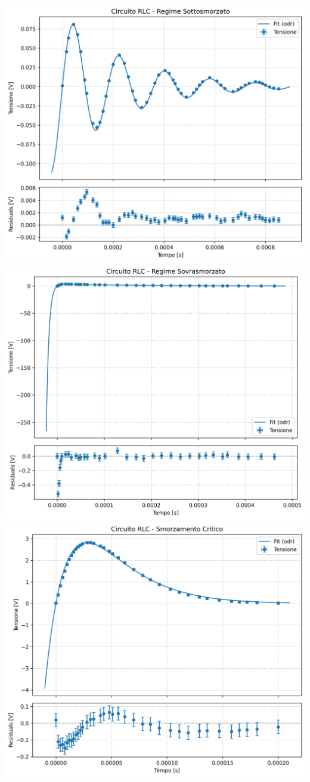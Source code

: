 \documentclass[a4paper]{article}
\begin{document}
\begin{center}
    \includegraphics[width=0.9\linewidth]{grafici/sottosmorzato.png}
    \label{fig: rlc sottosmorzato}
    \includegraphics[width=0.9\linewidth]{grafici/sovrasmorzato.png}
    \label{fig: rlc sovrasmorzato}
    \includegraphics[width=0.9\linewidth]{grafici/critico.png}

\end{center}
\end{document}
